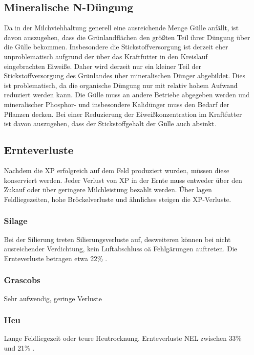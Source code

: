 \documentclass[12pt,titlepage]{scrartcl}
\begin{document}
\subsection{Mineralische N-Düngung}
\label{subsec:Lit:N-Düngung}

Da in der Milchviehhaltung generell eine ausreichende Menge Gülle anfällt, ist davon auszugehen, dass die Grünlandflächen den größten Teil ihrer Düngung über die Gülle bekommen.
Insbesondere die Stickstoffversorgung ist derzeit eher unproblematisch aufgrund der über das Kraftfutter in den Kreislauf eingebrachten Eiweiße.
Daher wird derzeit nur ein kleiner Teil der Stickstoffversorgung des Grünlandes über mineralischen Dünger abgebildet.
Dies ist problematisch, da die organische Düngung nur mit relativ hohem Aufwand reduziert werden kann.
Die Gülle muss an andere Betriebe abgegeben werden und mineralischer Phosphor- und insbesondere Kalidünger muss den Bedarf der Pflanzen decken.
Bei einer Reduzierung der Eiweißkonzentration im Kraftfutter ist davon auszugehen, dass der Stickstoffgehalt der Gülle auch absinkt.

\subsection{Ernteverluste}
\label{subsec:Lit:Ernte}

Nachdem die \ac{XP} erfolgreich auf dem Feld produziert wurden, müssen diese konserviert werden.
Jeder Verlust von \ac{XP} in der Ernte muss entweder über den Zukauf oder über geringere Milchleistung bezahlt werden.
Über lagen Feldliegezeiten, hohe Bröckelverluste und ähnliches steigen die \ac{XP}-Verluste.

\subsubsection{Silage}
\label{subsub:Silage}
Bei der Silierung treten Silierungsverluste auf, desweiteren können bei nicht ausreichender Verdichtung, kein Luftabschluss oä Fehlgärungen auftreten.
Die Ernteverluste betragen etwa 22\% \parencite[30]{fritz2018wirtschaftliche}.


\subsubsection{Grascobs}
\label{subsub:Peletts}
Sehr aufwendig, geringe Verluste \parencite[12f]{engel2013protein}

\subsubsection{Heu}
\label{subsub:Heu}
Lange Feldliegezeit oder teure Heutrocknung, Ernteverluste \ac{NEL} zwischen 33\% und 21\% \parencite[30]{fritz2018wirtschaftliche}.
\end{document}

